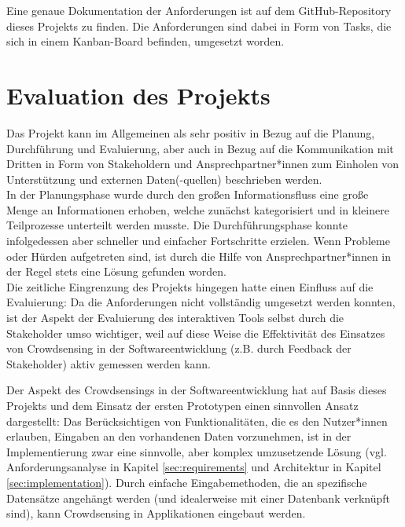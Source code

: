 Eine genaue Dokumentation der Anforderungen ist auf dem GitHub-Repository dieses Projekts zu finden. Die Anforderungen sind dabei in Form von Tasks, die sich in einem Kanban-Board befinden, umgesetzt worden.

\section{Evaluation des Projekts}
\label{sec:personal_evaluation}
Das Projekt kann im Allgemeinen als sehr positiv in Bezug auf die Planung, Durchführung und Evaluierung, aber auch in Bezug auf die Kommunikation mit Dritten in Form von Stakeholdern und Ansprechpartner*innen zum Einholen von Unterstützung und externen Daten(-quellen) beschrieben werden. \\ In der Planungsphase wurde durch den großen Informationsfluss eine große Menge an Informationen erhoben, welche zunächst kategorisiert und in kleinere Teilprozesse unterteilt werden musste. Die Durchführungsphase konnte infolgedessen aber schneller und einfacher Fortschritte erzielen. Wenn Probleme oder Hürden aufgetreten sind, ist durch die Hilfe von Ansprechpartner*innen in der Regel stets eine Lösung gefunden worden. \\ Die zeitliche Eingrenzung des Projekts hingegen hatte einen Einfluss auf die Evaluierung: Da die Anforderungen nicht vollständig umgesetzt werden konnten, ist der Aspekt der Evaluierung des interaktiven Tools selbst durch die Stakeholder umso wichtiger, weil auf diese Weise die Effektivität des Einsatzes von Crowdsensing in der Softwareentwicklung (z.B. durch Feedback der Stakeholder) aktiv gemessen werden kann.

Der Aspekt des Crowdsensings in der Softwareentwicklung hat auf Basis dieses Projekts und dem Einsatz der ersten Prototypen einen sinnvollen Ansatz dargestellt: Das Berücksichtigen von Funktionalitäten, die es den Nutzer*innen erlauben, Eingaben an den vorhandenen Daten vorzunehmen, ist in der Implementierung zwar eine sinnvolle, aber komplex umzusetzende Lösung  (vgl. Anforderungsanalyse in Kapitel \ref{sec:requirements} und Architektur in Kapitel \ref{sec:implementation}). Durch einfache Eingabemethoden, die an spezifische Datensätze angehängt werden (und idealerweise mit einer Datenbank verknüpft sind), kann Crowdsensing in Applikationen eingebaut werden.

